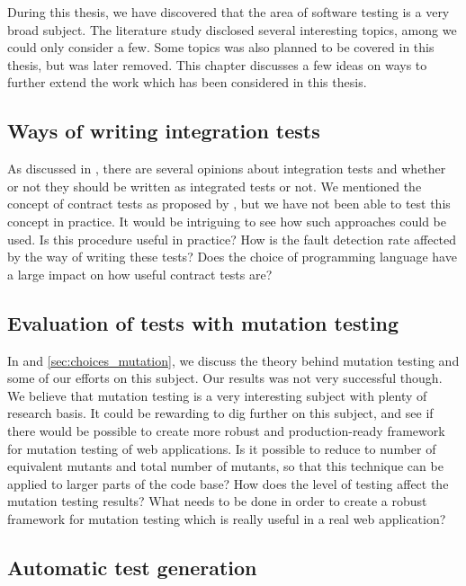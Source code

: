 
During this thesis, we have discovered that the area of software testing
is a very broad subject. The literature study disclosed several
interesting topics, among we could only consider a few. Some topics was
also planned to be covered in this thesis, but was later removed. This
chapter discusses a few ideas on ways to further extend the work which
has been considered in this thesis.\\


\subsection{Ways of writing integration tests}

As discussed in , there are several
opinions about integration tests and whether or not they should be
written as  integrated tests or not. We mentioned the concept of
contract tests as proposed by \citet{video:integrated_scam}, but we have
not been able to test this concept in practice. It would be intriguing
to see how such approaches could be used. Is this procedure useful in
practice? How is the fault detection rate affected by the way of writing
these tests? Does the choice of programming language have a large impact
on how useful contract tests are?\\


\subsection{Evaluation of tests with mutation testing}

In  and \ref{sec:choices_mutation}, we discuss
the theory behind mutation testing and some of our efforts on this
subject. Our results was not very successful though. We believe that
mutation testing is a very interesting subject with plenty of research
basis. It could be rewarding to dig further on this subject, and see if
there would be possible to create more robust and production-ready
framework for mutation testing of web applications. Is it possible to
reduce to number of equivalent mutants and total number of mutants, so
that  this technique can be applied to larger parts of the code base?
How does the level of testing affect the mutation testing results? What
needs to be done in order to create a robust framework for mutation
testing which is really useful in a real web application?\\


\subsection{Automatic test generation}

